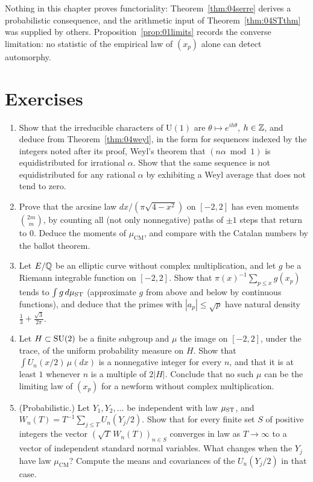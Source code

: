 Nothing in this chapter proves functoriality: Theorem~\ref{thm:04serre} derives a probabilistic consequence, and the arithmetic input of Theorem~\ref{thm:04STthm} was supplied by others. Proposition~\ref{prop:01limits} records the converse limitation: no statistic of the empirical law of $(x_p)$ alone can detect automorphy.

\section{Exercises}

\begin{enumerate}
\item Show that the irreducible characters of $\mathrm{U}(1)$ are $\theta \mapsto e^{ih\theta}$, $h\in\mathbb{Z}$, and deduce from Theorem~\ref{thm:04weyl}, in the form for sequences indexed by the integers noted after its proof, Weyl's theorem that $(n\alpha \bmod 1)$ is equidistributed for irrational $\alpha$. Show that the same sequence is not equidistributed for any rational $\alpha$ by exhibiting a Weyl average that does not tend to zero.
\item Prove that the arcsine law $dx/(\pi\sqrt{4-x^2})$ on $[-2,2]$ has even moments $\binom{2m}{m}$, by counting all (not only nonnegative) paths of $\pm1$ steps that return to $0$. Deduce the moments of $\mu_{\mathrm{CM}}$, and compare with the Catalan numbers by the ballot theorem.
\item Let $E/\mathbb{Q}$ be an elliptic curve without complex multiplication, and let $g$ be a Riemann integrable function on $[-2,2]$. Show that $\pi(x)^{-1}\sum_{p\le x}g(x_p)$ tends to $\int g\,d\mu_{\mathrm{ST}}$ (approximate $g$ from above and below by continuous functions), and deduce that the primes with $|a_p| \le \sqrt p$ have natural density $\frac13 + \frac{\sqrt3}{2\pi}$.
\item Let $H \subset \mathrm{SU}(2)$ be a finite subgroup and $\mu$ the image on $[-2,2]$, under the trace, of the uniform probability measure on $H$. Show that $\int U_n(x/2)\,\mu(dx)$ is a nonnegative integer for every $n$, and that it is at least $1$ whenever $n$ is a multiple of $2|H|$. Conclude that no such $\mu$ can be the limiting law of $(x_p)$ for a newform without complex multiplication.
\item\label{ex:04clt} (Probabilistic.) Let $Y_1, Y_2, \dots$ be independent with law $\mu_{\mathrm{ST}}$, and $W_n(T) = T^{-1}\sum_{j\le T}U_n(Y_j/2)$. Show that for every finite set $S$ of positive integers the vector $(\sqrt T\,W_n(T))_{n\in S}$ converges in law as $T\to\infty$ to a vector of independent standard normal variables. What changes when the $Y_j$ have law $\mu_{\mathrm{CM}}$? Compute the means and covariances of the $U_n(Y_j/2)$ in that case.
\end{enumerate}

